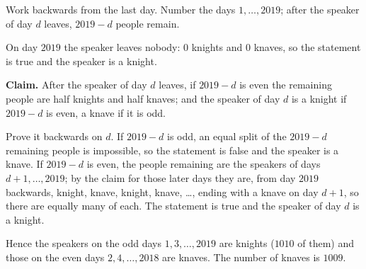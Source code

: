 Work backwards from the last day. Number the days $1,\dots,2019$; after the speaker of day $d$ leaves, $2019-d$ people remain.

On day $2019$ the speaker leaves nobody: $0$ knights and $0$ knaves, so the statement is true and the speaker is a knight.

\textbf{Claim.} After the speaker of day $d$ leaves, if $2019-d$ is even the remaining people are half knights and half knaves; and the speaker of day $d$ is a knight if $2019-d$ is even, a knave if it is odd.

Prove it backwards on $d$. If $2019-d$ is odd, an equal split of the $2019-d$ remaining people is impossible, so the statement is false and the speaker is a knave. If $2019-d$ is even, the people remaining are the speakers of days $d+1,\dots,2019$; by the claim for those later days they are, from day $2019$ backwards, knight, knave, knight, knave, \dots, ending with a knave on day $d+1$, so there are equally many of each. The statement is true and the speaker of day $d$ is a knight.

Hence the speakers on the odd days $1,3,\dots,2019$ are knights ($1010$ of them) and those on the even days $2,4,\dots,2018$ are knaves. The number of knaves is $\boxed{1009}$.
